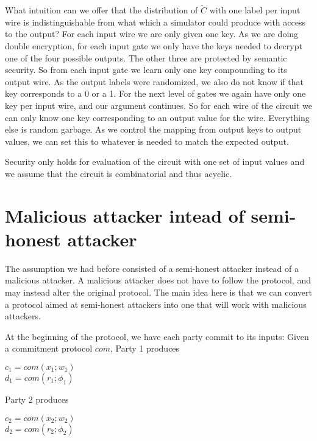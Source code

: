 What intuition can we offer that the 
distribution of $\tilde{C}$ with one label per input wire 
is indistinguishable from what which a simulator could produce with access to the output?
%
For each input wire we are only given one key.
As we are doing double encryption,
for each input gate we only have the keys needed to decrypt one of the four possible outputs.
The other three are protected by semantic security.
%
So from each input gate we learn only one key compounding to its output wire.
As the output labels were randomized, we also do not know if that key corresponds to a 0 or a 1. 
%
For the next level of gates we again have only one key per input wire, and our argument continues. 
%
 So for each wire of the circuit we can only know one key corresponding to an output value for the wire. 
 Everything else is random garbage.
% 
As we control the mapping from output keys to output values, we can set this to whatever is needed to
match the expected output. 


Security only holds for evaluation of the circuit with one set of input values and 
we assume that the circuit is combinatorial and thus acyclic. 






\section{Malicious attacker intead of semi-honest attacker}

The assumption we had before consisted of a semi-honest attacker instead of a malicious attacker. A malicious attacker does not have to follow the protocol, and may instead alter the original protocol. The main idea here is that we can convert a protocol aimed at semi-honest attackers into one that will work with malicious attackers.

At the beginning of the protocol, we have each party commit to its inputs:
Given a commitment protocol $com$, Party 1 produces
\begin{center}
$c_1 = com(x_1; w_1)$ \\
$d_1 = com(r_1; \phi_1)$ \\
\end{center}
Party 2 produces
\begin{center}
$c_2 = com(x_2; w_2)$\\
$d_2 = com(r_2; \phi_2)$
\end{center}


